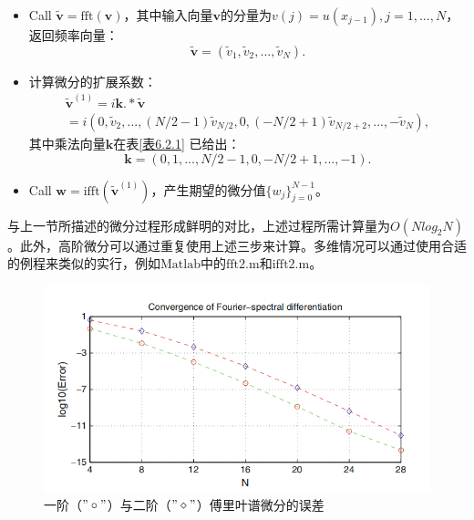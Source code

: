 \begin{itemize}
    \item  Call $\widetilde{\textbf{v}} = \mathrm{fft}(\textbf{v})$，其中输入向量$\textbf{v}$的分量为$v(j) = u(x_{j-1}),j = 1,...,N$，返回频率向量：
    \begin{equation*}
        \widetilde{\textbf{v}} = \left( \widetilde{v}_1,\widetilde{v}_2,...,\widetilde{v}_N \right).
    \end{equation*}
    \item  计算微分的扩展系数：
    \begin{equation*}
    \begin{gathered}
        \widetilde{\textbf{v}}^{(1)} = i\textbf{k.}*\widetilde{\textbf{v}}  \\
        = i\left( 0,\widetilde{v}_2,...,(N/2 - 1)\widetilde{v}_{N/2},0,(-N/2 + 1)\widetilde{v}_{N/2 + 2},...,-\widetilde{v}_N \right),
    \end{gathered}    
    \end{equation*}
    其中乘法向量$\textbf{k}$在表\ref{表6.2.1} 已给出：
    \begin{equation}
        \textbf{k} = (0,1,...,N/2 - 1,0,-N/2 +1,...,-1).
        \label{6.2.40}
    \end{equation}
    \item  Call $\textbf{w} = \mathrm{ifft}(\widetilde{\textbf{v}}^{(1)})$，产生期望的微分值$\{ w_j \}_{j = 0}^{N-1}$。
\end{itemize}        

    与上一节所描述的微分过程形成鲜明的对比，上述过程所需计算量为$O(Nlog_2N)$。此外，高阶微分可以通过重复使用上述三步来计算。多维情况可以通过使用合适的例程来类似的实行，例如$\mathrm{Matlab}$中的$\mathrm{fft2.m}$和$\mathrm{ifft2.m}$。

\begin{figure}[!htbp]
\centering
\includegraphics[scale=0.5]{Contents/chapter6/figures/2-1.png}
\caption{一阶（$"\circ"$）与二阶（$"\diamond"$）傅里叶谱微分的误差}
\label{图2.1}
\end{figure} 
    
